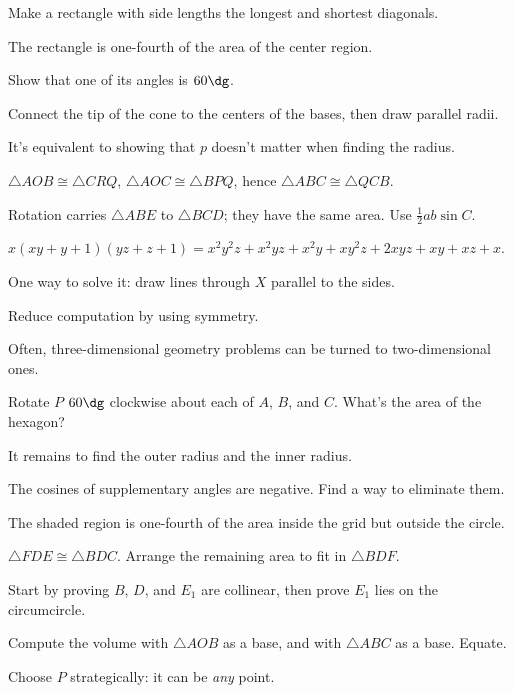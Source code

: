 \documentclass[11pt,paper=letter]{scrartcl}
\begin{document}
\begin{enumthin}[leftmargin=0pt]
\item \label{h:gb92} Make a rectangle with side lengths the longest and shortest diagonals.
\item \label{h:os43} The rectangle is one-fourth of the area of the center region.
\item \label{h:vs01} Show that one of its angles is $60\dg$.
\item \label{h:pc44} Connect the tip of the cone to the centers of the bases, then draw parallel radii.
\item \label{h:dt43} It's equivalent to showing that $p$ doesn't matter when finding the radius.
\item \label{h:gbf5} $\triangle AOB \cong \triangle CRQ$, $\triangle AOC \cong \triangle BPQ$, hence $\triangle ABC \cong \triangle QCB$.
\item \label{h:pt54} Rotation carries $\triangle ABE$ to $\triangle BCD$; they have the same area. Use $\frac12 ab \sin C$.
\item \label{h:rt06} $x(xy+y+1)(yz+z+1) = x^2y^2z + x^2yz + x^2y + xy^2z + 2xyz + xy + xz + x$.
\item \label{h:vt41} One way to solve it: draw lines through $X$ parallel to the sides.
\item \label{h:rt41} Reduce computation by using symmetry.
\item \label{h:gbc1} Often, three-dimensional geometry problems can be turned to two-dimensional ones.
\item \label{h:pt32} Rotate $P$ $60\dg$ clockwise about each of $A$, $B$, and $C$. What's the area of the hexagon?
\item \label{h:np01} It remains to find the outer radius and the inner radius.
\item \label{h:pl41} The cosines of supplementary angles are negative. Find a way to eliminate them.
\item \label{h:os22} The shaded region is one-fourth of the area inside the grid but outside the circle.
\item \label{h:gba4} $\triangle FDE \cong \triangle BDC$. Arrange the remaining area to fit in $\triangle BDF$.
\item \label{h:vs03} Start by proving $B$, $D$, and $E_1$ are collinear, then prove $E_1$ lies on the circumcircle.
\item \label{h:dg42} Compute the volume with $\triangle AOB$ as a base, and with $\triangle ABC$ as a base. Equate.
\item \label{h:vt21} Choose $P$ strategically: it can be \emph{any} point.

\end{enumthin}
\end{document}
